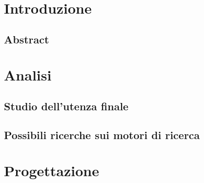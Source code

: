 \documentclass[a4paper]{article}
\begin{document}
    \copertina

    \tableofcontents

    \newpage

    \section{Introduzione}
	    	\subsection{Abstract}
		    	

	\newpage

	\section{Analisi}
		\subsection{Studio dell'utenza finale}
			
		\subsection{Possibili ricerche sui motori di ricerca}
			

	\newpage

	\section{Progettazione}
\end{document}

